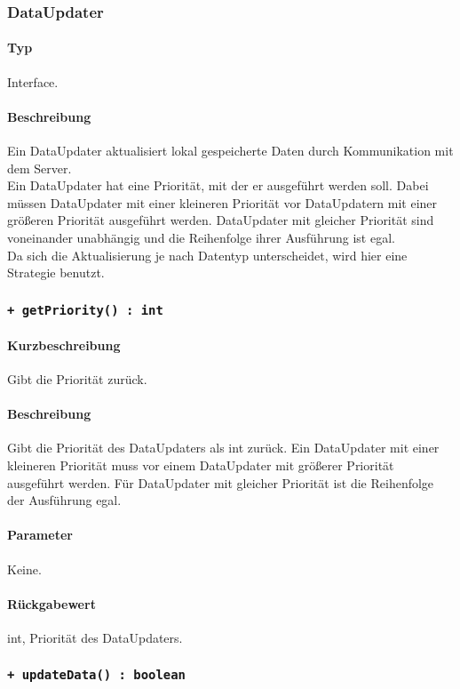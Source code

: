 \subsubsection{DataUpdater}
\paragraph*{Typ}
Interface.
\paragraph*{Beschreibung}
Ein DataUpdater aktualisiert lokal gespeicherte Daten durch Kommunikation mit dem Server.\\
Ein DataUpdater hat eine Priorität, mit der er ausgeführt werden soll. Dabei müssen 
DataUpdater mit einer kleineren Priorität vor DataUpdatern mit einer größeren Priorität 
ausgeführt werden. DataUpdater mit gleicher Priorität sind voneinander unabhängig und
die Reihenfolge ihrer Ausführung ist egal.\\
Da sich die Aktualisierung je nach Datentyp unterscheidet, wird hier eine Strategie benutzt.

\subsubsection*{\texttt{+ getPriority() : int}}%
\paragraph*{Kurzbeschreibung}
Gibt die Priorität zurück.
\paragraph*{Beschreibung}
Gibt die Priorität des DataUpdaters als int zurück. Ein DataUpdater mit einer kleineren
Priorität muss vor einem DataUpdater mit größerer Priorität ausgeführt werden.
Für DataUpdater mit gleicher Priorität ist die Reihenfolge der Ausführung egal.
\paragraph*{Parameter}
Keine.
\paragraph*{Rückgabewert}
int, Priorität des DataUpdaters.

\subsubsection*{\texttt{+ updateData() : boolean}}%
